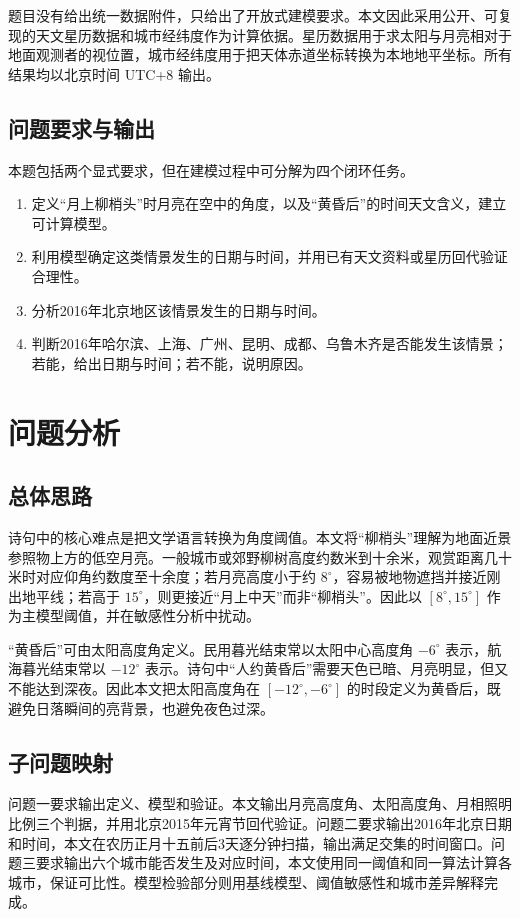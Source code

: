 \documentclass[UTF8,a4paper,12pt]{ctexart}
\begin{document}
题目没有给出统一数据附件，只给出了开放式建模要求。本文因此采用公开、可复现的天文星历数据和城市经纬度作为计算依据。星历数据用于求太阳与月亮相对于地面观测者的视位置，城市经纬度用于把天体赤道坐标转换为本地地平坐标。所有结果均以北京时间 UTC+8 输出。

\subsection{问题要求与输出}
本题包括两个显式要求，但在建模过程中可分解为四个闭环任务。
\begin{enumerate}[label=\textbf{任务\arabic*：}]
\item 定义“月上柳梢头”时月亮在空中的角度，以及“黄昏后”的时间天文含义，建立可计算模型。
\item 利用模型确定这类情景发生的日期与时间，并用已有天文资料或星历回代验证合理性。
\item 分析2016年北京地区该情景发生的日期与时间。
\item 判断2016年哈尔滨、上海、广州、昆明、成都、乌鲁木齐是否能发生该情景；若能，给出日期与时间；若不能，说明原因。
\end{enumerate}

\section{问题分析}
\subsection{总体思路}
诗句中的核心难点是把文学语言转换为角度阈值。本文将“柳梢头”理解为地面近景参照物上方的低空月亮。一般城市或郊野柳树高度约数米到十余米，观赏距离几十米时对应仰角约数度至十余度；若月亮高度小于约 $8^\circ$，容易被地物遮挡并接近刚出地平线；若高于 $15^\circ$，则更接近“月上中天”而非“柳梢头”。因此以 $[8^\circ,15^\circ]$ 作为主模型阈值，并在敏感性分析中扰动。

“黄昏后”可由太阳高度角定义。民用暮光结束常以太阳中心高度角 $-6^\circ$ 表示，航海暮光结束常以 $-12^\circ$ 表示。诗句中“人约黄昏后”需要天色已暗、月亮明显，但又不能达到深夜。因此本文把太阳高度角在 $[-12^\circ,-6^\circ]$ 的时段定义为黄昏后，既避免日落瞬间的亮背景，也避免夜色过深。

\subsection{子问题映射}
问题一要求输出定义、模型和验证。本文输出月亮高度角、太阳高度角、月相照明比例三个判据，并用北京2015年元宵节回代验证。问题二要求输出2016年北京日期和时间，本文在农历正月十五前后3天逐分钟扫描，输出满足交集的时间窗口。问题三要求输出六个城市能否发生及对应时间，本文使用同一阈值和同一算法计算各城市，保证可比性。模型检验部分则用基线模型、阈值敏感性和城市差异解释完成。
\end{document}

